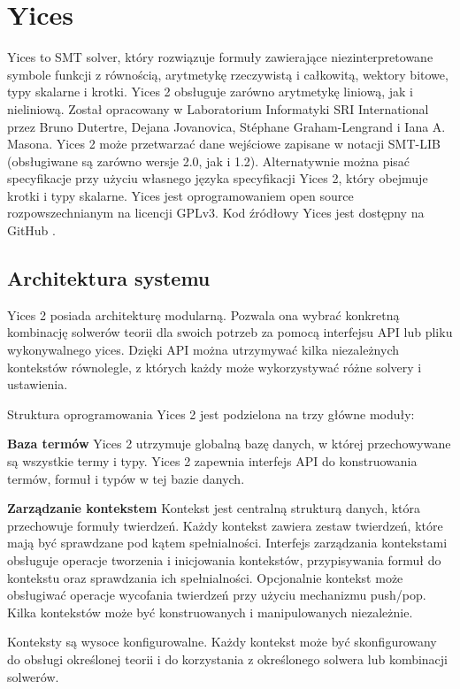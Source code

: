 \section{Yices}
Yices to SMT solver, który rozwiązuje formuły zawierające niezinterpretowane symbole funkcji z równością, arytmetykę rzeczywistą i całkowitą, wektory bitowe, typy skalarne i krotki. Yices 2 obsługuje zarówno arytmetykę liniową, jak i nieliniową.
Został opracowany w Laboratorium Informatyki SRI International przez Bruno Dutertre, Dejana Jovanovica, Stéphane Graham-Lengrand i Iana A. Masona.
Yices 2 może przetwarzać dane wejściowe zapisane w notacji SMT-LIB (obsługiwane są zarówno wersje 2.0, jak i 1.2). Alternatywnie można pisać specyfikacje przy użyciu własnego języka specyfikacji Yices 2, który obejmuje krotki i typy skalarne. 
Yices jest oprogramowaniem open source rozpowszechnianym na licencji GPLv3. Kod źródłowy Yices jest dostępny na GitHub \cite{yices2.2}.

\subsection{Architektura systemu}
Yices 2 posiada architekturę modularną. Pozwala ona wybrać konkretną kombinację solwerów teorii dla swoich potrzeb za pomocą interfejsu API lub pliku wykonywalnego yices. Dzięki API można utrzymywać kilka niezależnych kontekstów równolegle, z których każdy może wykorzystywać różne solvery i ustawienia.

Struktura oprogramowania Yices 2 jest podzielona na trzy główne moduły:

\textbf{Baza termów} Yices 2 utrzymuje globalną bazę danych, w której przechowywane są wszystkie termy i typy.
Yices 2 zapewnia interfejs API do konstruowania termów, formuł i typów w tej bazie danych.

\textbf{Zarządzanie kontekstem} Kontekst jest centralną strukturą danych, która przechowuje formuły twierdzeń.
Każdy kontekst zawiera zestaw twierdzeń, które mają być sprawdzane pod kątem spełnialności. Interfejs zarządzania kontekstami obsługuje operacje tworzenia i inicjowania kontekstów, przypisywania formuł do kontekstu oraz sprawdzania ich spełnialności. Opcjonalnie kontekst może obsługiwać operacje wycofania twierdzeń przy użyciu mechanizmu push/pop. Kilka kontekstów może być konstruowanych i manipulowanych niezależnie.

Konteksty są wysoce konfigurowalne. Każdy kontekst może być skonfigurowany do obsługi określonej teorii i do korzystania z określonego solwera lub kombinacji solwerów.

